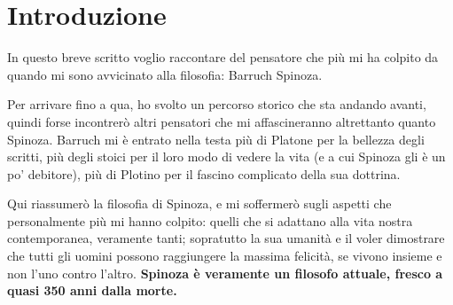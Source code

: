 \chapter*{Introduzione}

In questo breve scritto voglio raccontare del pensatore che più mi ha colpito da quando mi sono avvicinato alla filosofia: Barruch Spinoza.

Per arrivare fino a qua, ho svolto un percorso storico che sta andando avanti, quindi forse incontrerò  altri pensatori che mi affascineranno altrettanto quanto Spinoza. Barruch mi è entrato nella testa più di Platone per la bellezza degli scritti, più degli stoici per il loro modo di vedere la vita (e a cui Spinoza gli è un po' debitore), più di Plotino per il fascino complicato della sua dottrina.

Qui riassumerò la filosofia di Spinoza, e mi soffermerò sugli aspetti che  personalmente più mi hanno colpito: quelli che si adattano alla vita nostra contemporanea, veramente tanti; sopratutto la sua umanità e il voler dimostrare che tutti gli uomini possono raggiungere la massima felicità, se vivono insieme e non l'uno contro l'altro. \textbf{Spinoza è veramente un filosofo attuale, fresco a quasi 350 anni dalla morte.}
\newpage